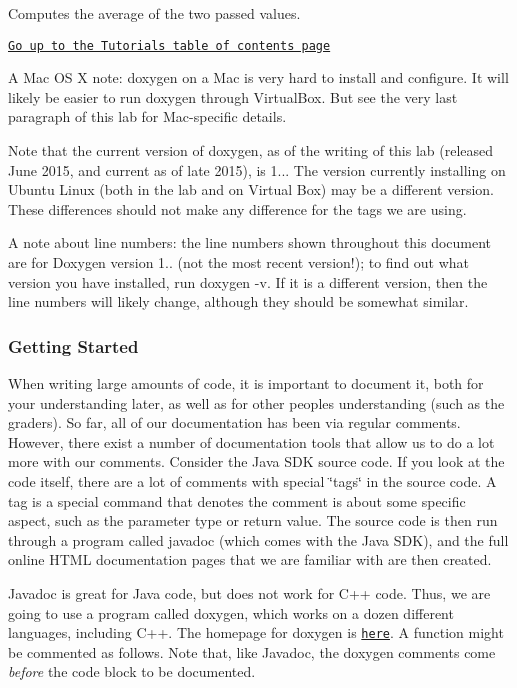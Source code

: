 Computes the average of the two passed values.
\begin{DoxyItemize}
\item 
\end{DoxyItemize}

\href{../index.html}{\tt Go up to the Tutorials table of contents page}

A Mac OS X note\+: doxygen on a Mac is very hard to install and configure. It will likely be easier to run doxygen through Virtual\+Box. But see the very last paragraph of this lab for Mac-\/specific details.

Note that the current version of doxygen, as of the writing of this lab (released June 2015, and current as of late 2015), is 1... The version currently installing on Ubuntu Linux (both in the lab and on Virtual Box) may be a different version. These differences should not make any difference for the tags we are using.

A note about line numbers\+: the line numbers shown throughout this document are for Doxygen version 1.. (not the most recent version!); to find out what version you have installed, run {\ttfamily doxygen -\/v}. If it is a different version, then the line numbers will likely change, although they should be somewhat similar.

\subsubsection*{Getting Started}

When writing large amounts of code, it is important to document it, both for your understanding later, as well as for other people\textquotesingle{}s understanding (such as the graders). So far, all of our documentation has been via regular comments. However, there exist a number of documentation tools that allow us to do a lot more with our comments. Consider the Java S\+DK source code. If you look at the code itself, there are a lot of comments with special \char`\"{}tags\char`\"{} in the source code. A tag is a special command that denotes the comment is about some specific aspect, such as the parameter type or return value. The source code is then run through a program called javadoc (which comes with the Java S\+DK), and the full online H\+T\+ML documentation pages that we are familiar with are then created.

Javadoc is great for Java code, but does not work for C++ code. Thus, we are going to use a program called doxygen, which works on a dozen different languages, including C++. The homepage for doxygen is \href{http://www.doxygen.org}{\tt here}. A function might be commented as follows. Note that, like Javadoc, the doxygen comments come {\itshape before} the code block to be documented.


